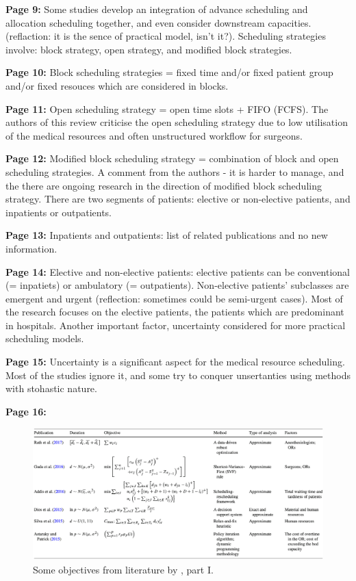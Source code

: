     \textbf{Page 9:}
    Some studies develop an integration of advance scheduling and allocation scheduling together, and even consider downstream capacities. (reflaction: it is the sence of practical model, isn't it?). Scheduling strategies involve: block strategy, open strategy, and modified block strategies.

    \textbf{Page 10:}
    Block scheduling strategies = fixed time and/or fixed patient group and/or fixed resouces which are considered in blocks.

    \textbf{Page 11:}
    Open scheduling strategy = open time slots + FIFO (FCFS). The authors of this review criticise the open scheduling strategy due to low utilisation of the medical resources and often unstructured workflow for surgeons.
    
    \textbf{Page 12:}
    Modified block scheduling strategy = combination of block and open scheduling strategies. A comment from the authors - it is harder to manage, and the there are ongoing research in the direction of modified block scheduling strategy. There are two segments of patients: elective or non-elective patients, and inpatients or outpatients. 

    \textbf{Page 13:}
    Inpatients and outpatients: list of related publications and no new information.
    
    \textbf{Page 14:}
    Elective and non-elective patients: elective patients can be conventional (= inpatiets) or ambulatory (= outpatients). Non-elective patients' subclasses are emergent and urgent (reflection: sometimes could be semi-urgent cases). Most of the research focuses on the elective patients, the patients which are predominant in hospitals. Another important factor, uncertainty considered for more practical scheduling models.
    
    \textbf{Page 15:}
    Uncertainty is a significant aspect for the medical resource scheduling. Most of the studies ignore it, and some try to conquer unsertanties using methods with stohastic nature.
    
    \textbf{Page 16:}
    \begin{figure}[H]
        \centering
        \includegraphics[width=1\textwidth]{figures/0013_SR01CN19/fig3.png}
        \caption{Some objectives from literature by \cite{x203}, part I.}
        \label{fig3:0013_SR01CN19}
    \end{figure}
    
